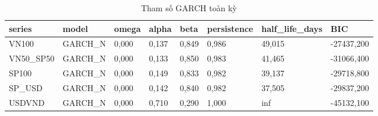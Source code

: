 \begin{table}
\caption{Tham số GARCH toàn kỳ}
\label{tab:T3_garch_params}
\begin{tabular}{llllllll}
\toprule
series & model & omega & alpha & beta & persistence & half\_life\_days & BIC \\
\midrule
VN100 & GARCH\_N & 0,000 & 0,137 & 0,849 & 0,986 & 49,015 & -27437,200 \\
VN50\_SP50 & GARCH\_N & 0,000 & 0,133 & 0,850 & 0,983 & 41,465 & -31066,400 \\
SP100 & GARCH\_N & 0,000 & 0,149 & 0,833 & 0,982 & 39,137 & -29718,800 \\
SP\_USD & GARCH\_N & 0,000 & 0,142 & 0,840 & 0,982 & 37,505 & -29837,200 \\
USDVND & GARCH\_N & 0,000 & 0,710 & 0,290 & 1,000 & inf & -45132,100 \\
\bottomrule
\end{tabular}
\end{table}
